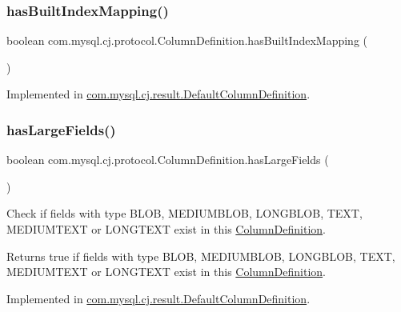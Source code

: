 \subsubsection{\texorpdfstring{has\+Built\+Index\+Mapping()}{hasBuiltIndexMapping()}}
{\footnotesize\ttfamily boolean com.\+mysql.\+cj.\+protocol.\+Column\+Definition.\+has\+Built\+Index\+Mapping (\begin{DoxyParamCaption}{ }\end{DoxyParamCaption})}



Implemented in \mbox{\hyperlink{classcom_1_1mysql_1_1cj_1_1result_1_1_default_column_definition_a0eefd044779756c0945361b5a0627a7b}{com.\+mysql.\+cj.\+result.\+Default\+Column\+Definition}}.

\mbox{\label{interfacecom_1_1mysql_1_1cj_1_1protocol_1_1_column_definition_adc02edd67e54d79c7f91d41d027e44ae}} 
\subsubsection{\texorpdfstring{has\+Large\+Fields()}{hasLargeFields()}}
{\footnotesize\ttfamily boolean com.\+mysql.\+cj.\+protocol.\+Column\+Definition.\+has\+Large\+Fields (\begin{DoxyParamCaption}{ }\end{DoxyParamCaption})}

Check if fields with type B\+L\+OB, M\+E\+D\+I\+U\+M\+B\+L\+OB, L\+O\+N\+G\+B\+L\+OB, T\+E\+XT, M\+E\+D\+I\+U\+M\+T\+E\+XT or L\+O\+N\+G\+T\+E\+XT exist in this \mbox{\hyperlink{interfacecom_1_1mysql_1_1cj_1_1protocol_1_1_column_definition}{Column\+Definition}}.

\begin{DoxyReturn}{Returns}
true if fields with type B\+L\+OB, M\+E\+D\+I\+U\+M\+B\+L\+OB, L\+O\+N\+G\+B\+L\+OB, T\+E\+XT, M\+E\+D\+I\+U\+M\+T\+E\+XT or L\+O\+N\+G\+T\+E\+XT exist in this \mbox{\hyperlink{interfacecom_1_1mysql_1_1cj_1_1protocol_1_1_column_definition}{Column\+Definition}}. 
\end{DoxyReturn}


Implemented in \mbox{\hyperlink{classcom_1_1mysql_1_1cj_1_1result_1_1_default_column_definition_a221996852cd52bf81bd9e3ecb8ab6ff5}{com.\+mysql.\+cj.\+result.\+Default\+Column\+Definition}}.

